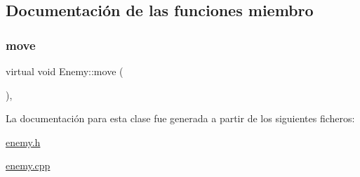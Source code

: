 \subsection{Documentación de las funciones miembro}
\hypertarget{class_enemy_a1c208ac4a80b892f9692222bcb96f6ae}{}\label{class_enemy_a1c208ac4a80b892f9692222bcb96f6ae} 
\subsubsection{\texorpdfstring{move}{move}}
{\footnotesize\ttfamily virtual void Enemy\+::move (\begin{DoxyParamCaption}{ }\end{DoxyParamCaption})\hspace{0.3cm}{\ttfamily [pure virtual]}, {\ttfamily [slot]}}



La documentación para esta clase fue generada a partir de los siguientes ficheros\+:\begin{DoxyCompactItemize}
\item 
\hyperlink{enemy_8h}{enemy.\+h}\item 
\hyperlink{enemy_8cpp}{enemy.\+cpp}\end{DoxyCompactItemize}
